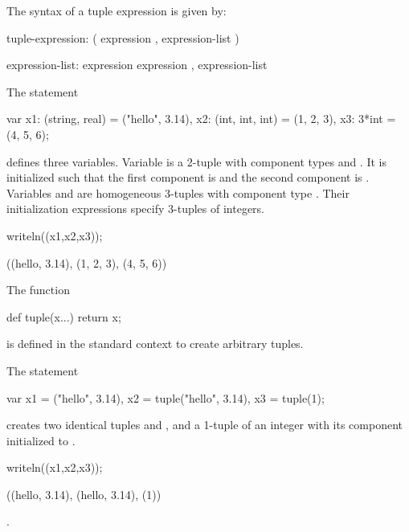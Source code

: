 The syntax of a tuple expression is given by:
\begin{syntax}
tuple-expression:
  ( expression , expression-list )

expression-list:
  expression
  expression , expression-list
\end{syntax}

\begin{example}
\begin{chapelpre}
\end{chapelpre}
The statement
\begin{chapel}
var x1: (string, real) = ("hello", 3.14),
    x2: (int, int, int) = (1, 2, 3),
    x3: 3*int = (4, 5, 6);
\end{chapel}
defines three variables.  Variable  is a 2-tuple with
component types  and .  It is initialized such
that the first component is  and the second
component is .  Variables  and  are
homogeneous 3-tuples with component type .  Their
initialization expressions specify 3-tuples of integers.
\begin{chapelpost}
writeln((x1,x2,x3));
\end{chapelpost}
\begin{chapeloutput}
((hello, 3.14), (1, 2, 3), (4, 5, 6))
\end{chapeloutput}
\end{example}

The function
\begin{chapel}
def tuple(x...) return x;
\end{chapel}
is defined in the standard context to create arbitrary tuples.

\begin{example}
\begin{chapelpre}
\end{chapelpre}
The statement
\begin{chapel}
var x1 =      ("hello", 3.14),
    x2 = tuple("hello", 3.14),
    x3 = tuple(1);
\end{chapel}
creates two identical tuples  and , and a 1-tuple of
an integer  with its component initialized to .
\begin{chapelpost}
writeln((x1,x2,x3));
\end{chapelpost}
\begin{chapeloutput}
((hello, 3.14), (hello, 3.14), (1))
\end{chapeloutput}
\end{example}.

